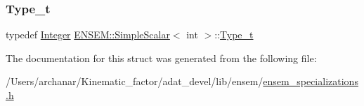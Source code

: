 \subsubsection{\texorpdfstring{Type\_t}{Type\_t}\hspace{0.1cm}{\footnotesize\ttfamily [2/2]}}
{\footnotesize\ttfamily typedef \mbox{\hyperlink{group__defs_gab13d060149cdd80ab40fd8d653f60117}{Integer}} \mbox{\hyperlink{structENSEM_1_1SimpleScalar}{E\+N\+S\+E\+M\+::\+Simple\+Scalar}}$<$ int $>$\+::\mbox{\hyperlink{structENSEM_1_1SimpleScalar_3_01int_01_4_a3d6a45a8cd225aba61dd4c2593501d66}{Type\+\_\+t}}}



The documentation for this struct was generated from the following file\+:\begin{DoxyCompactItemize}
\item 
/\+Users/archanar/\+Kinematic\+\_\+factor/adat\+\_\+devel/lib/ensem/\mbox{\hyperlink{lib_2ensem_2ensem__specializations_8h}{ensem\+\_\+specializations.\+h}}\end{DoxyCompactItemize}
